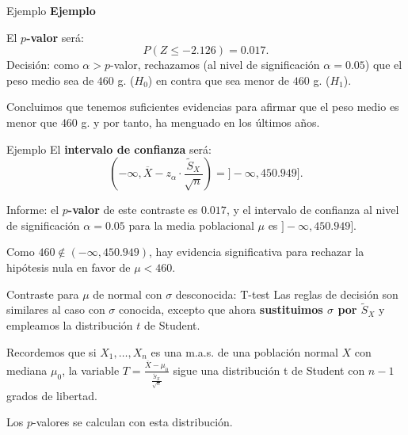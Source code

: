 \documentclass[
  ignorenonframetext,
]{beamer}
\begin{document}
\begin{frame}{Ejemplo}
\protect\hypertarget{ejemplo-7}{}
\textbf{Ejemplo}

El \textbf{\(p\)-valor} será: \[
P(Z\leq -2.126)=
0.017.
\] Decisión: como \(\alpha>p\)-valor, rechazamos (al nivel de
significación \(\alpha=0.05\)) que el peso medio sea de \(460\) g.
(\(H_0\)) en contra que sea menor de \(460\) g. (\(H_1\)).

Concluimos que tenemos suficientes evidencias para afirmar que el peso
medio es menor que \(460\) g. y por tanto, ha menguado en los últimos
años.
\end{frame}

\begin{frame}{Ejemplo}
\protect\hypertarget{ejemplo-8}{}
El \textbf{intervalo de confianza} será: \[
\left(-\infty, \overline{X}-z_{\alpha}\cdot \frac{\widetilde{S}_X}{\sqrt{n}}\right)=]-\infty,450.949].
\]

Informe: el \textbf{\(p\)-valor} de este contraste es \(0.017\), y el
intervalo de confianza al nivel de significación \(\alpha=0.05\) para la
media poblacional \(\mu\) es \(]-\infty,450.949]\).

Como \(460\not\in (-\infty,450.949)\), hay evidencia significativa para
rechazar la hipótesis nula en favor de \(\mu<460\).
\end{frame}

\begin{frame}{Contraste para \(\mu\) de normal con \(\sigma\)
desconocida: T-test}
\protect\hypertarget{contraste-para-mu-de-normal-con-sigma-desconocida-t-test}{}
Las reglas de decisión son similares al caso con \(\sigma\) conocida,
excepto que ahora \textbf{sustituimos \(\sigma\) por
\(\widetilde{S}_X\)} y empleamos la distribución \(t\) de Student.

Recordemos que si \(X_1,\ldots,X_n\) es una m.a.s. de una población
normal \(X\) con mediana \(\mu_0\), la variable
\(T= \frac{\overline{X}-\mu_0}{\frac{\widetilde{S}_X}{\sqrt{n}}}\) sigue
una distribución t de Student con \(n-1\) grados de libertad.

Los \(p\)-valores se calculan con esta distribución.
\end{frame}
\end{document}

